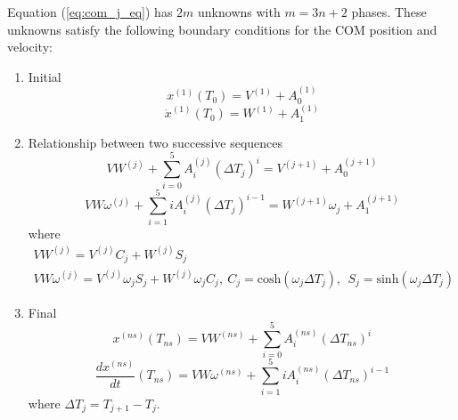 \documentclass[journal]{IEEEtran}
\begin{document}
Equation (\ref{eq:com_j_eq}) has $2m$ unknowns with $m=3n+2$ phases. These unknowns satisfy the following boundary conditions for the COM position and velocity:
\begin{enumerate}
	\item Initial
\begin{equation}
\label{eq:com_init_pos_cons}
x^{(1)}(T_{0})=V^{(1)}+A_{0}^{(1)}
\end{equation}
\begin{equation}
\label{eq:com_init_spd_cons}
\dot{x}^{(1)}(T_{0})=W^{(1)}+A_{1}^{(1)}
\end{equation}
	\item Relationship between two successive sequences
\begin{equation}
\label{eq:com_continu_pos_cons}
VW^{(j)}+\sum_{i=0}^{5}A_{i}^{(j)}(\Delta T_{j})^{i}=V^{(j+1)}+A_{0}^{(j+1)}
\end{equation}
\begin{equation}
\label{eq:com_continu_spd_cons}
VW\omega^{(j)}+\sum_{i=1}^{5}iA_{i}^{(j)}(\Delta T_{j})^{i-1}=W^{(j+1)}\omega_{j}+A_{1}^{(j+1)}
\end{equation}
where
\begin{equation}
\begin{array}{l}
VW^{(j)}=V^{(j)}C_{j}+W^{(j)}S_{j}\\ 
VW\omega^{(j)}=V^{(j)}\omega_{j}S_{j}+W^{(j)}\omega_{j}C_{j}, \ C_{j}=\mbox{cosh}(\omega_{j}\Delta T_{j}), \ \ S_{j}=\mbox{sinh}(\omega_{j}\Delta T_{j})
\end{array}\nonumber
\end{equation}
	\item Final
\begin{equation}
\label{eq:com_fin_pos_cons}
x^{(ns)}(T_{ns})=VW^{(ns)}+\sum_{i=0}^{5}A_{i}^{(ns)}(\Delta T_{ns})^{i}
\end{equation}
\begin{equation}
\label{eq:com_fin_spd_cons}
\dfrac{d{x}^{(ns)}}{dt}(T_{ns})=VW\omega^{(ns)}+\sum_{i=1}^{5}iA_{i}^{(ns)}(\Delta T_{ns})^{i-1}
\end{equation}
where $\Delta T_{j}=T_{j+1}-T_{j}$.
\end{enumerate}
\end{document}
